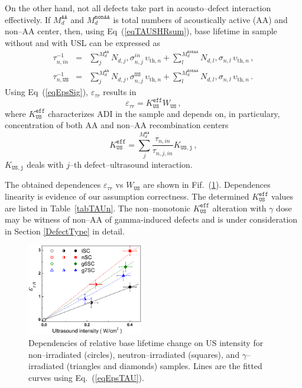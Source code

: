 \documentclass[aip,jap, amsmath,amssymb,reprint]{revtex4-1}
\begin{document}
On the other hand, not all defects take part in acousto--defect interaction effectively.
If  $M_d^\mathtt{AA}$ and $M_d^\mathtt{nonAA}$ is total numbers of acoustically active (AA) and non--AA center,
then, using Eq~(\ref{eqTAUSHRsum}), base lifetime in sample without and with USL can be expressed as
\begin{eqnarray}
\tau_{n,in}^{-1}&=&\sum_j^{M_d^\mathtt{AA}}N_{d,j},\sigma_{n,j}^{in}\,\upsilon_{\mathrm{th},n}+
\sum_l^{M_d^\mathtt{nonAA}}N_{d,l},\sigma_{n,l}\,\upsilon_{\mathrm{th},n}\,,\nonumber\\
\tau_{n,\mathtt{US}}^{-1}&=&\sum_j^{M_d^\mathtt{AA}}N_{d,j},\sigma_{n,j}^\mathtt{US}\,\upsilon_{\mathrm{th},n}+
\sum_l^{M_d^\mathtt{nonAA}}N_{d,l},\sigma_{n,l}\,\upsilon_{\mathrm{th},n}\,.\nonumber
\end{eqnarray}
Using Eq~(\ref{eqEpsSig}), $\varepsilon_{\tau r}$  results in
\begin{equation}
\label{eqEpsTAU}
\varepsilon_{\tau r}=K_\mathtt{US}^\mathtt{eff}W_\mathtt{US}\,,
\end{equation}
where $K_\mathtt{US}^\mathtt{eff}$ characterizes ADI in the sample
and depends on, in particulary, concentration of both AA and non--AA recombination centers
\begin{equation}
\label{eqKeff}
K_\mathtt{US}^\mathtt{eff}=\sum_j^{M_d^\mathtt{AA}}\frac{\tau_{n,in}}{\tau_{n,j,in}}K_\mathtt{US,j}\,,
\end{equation}
$K_\mathtt{US,j}$ deals with $j$--th defect--ultrasound interaction.

The obtained dependences $\varepsilon_{\tau r}$ vs $W_\mathtt{US}$ are shown in Fif.~(\ref{fig_Kus}).
Dependences linearity is evidence of our assumption correctness.
The determined $K_\mathtt{US}^\mathtt{eff}$ values are listed in Table~\ref{tabTAUn}.
The non--monotonic $K_\mathtt{US}^\mathtt{eff}$ alteration with $\gamma$ dose may be witness of non--AA of gamma-induced defects and
is under consideration in Section \ref{DefectType} in detail.

\begin{figure}
\includegraphics[width=0.45\textwidth]{olikhFig7}%
\caption{\label{fig_Kus}
Dependencies of relative base lifetime change on US intensity for non--irradiated (circles), neutron--irradiated (squares), and $\gamma$--irradiated
(triangles and diamonds) samples.
Lines are the fitted curves using Eq.~(\ref{eqEpsTAU}).
}%
\end{figure}
\end{document}
